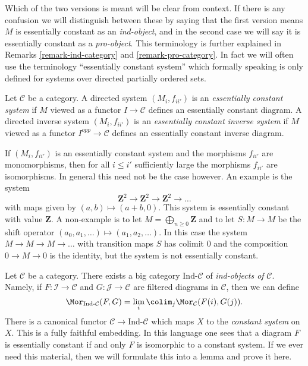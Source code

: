 \noindent
Which of the two versions is meant will be clear from context. If there is
any confusion we will distinguish between these by saying that the first
version means $M$ is essentially constant as an {\it ind-object}, and in
the second case we will say it is essentially constant as a {\it pro-object}.
This terminology is further explained in
Remarks \ref{remark-ind-category} and \ref{remark-pro-category}.
In fact we will often use the terminology ``essentially constant system''
which formally speaking is only defined for systems over directed partially
ordered sets.

\begin{definition}
\label{definition-essentially-constant-system}
Let $\mathcal{C}$ be a category. A directed system
$(M_i, f_{ii'})$ is an {\it essentially constant system}
if $M$ viewed as a functor $I \to \mathcal{C}$
defines an essentially constant diagram. A directed inverse system
$(M_i, f_{ii'})$ is an {\it essentially constant inverse system} if
$M$ viewed as a functor $I^{opp} \to \mathcal{C}$ defines an
essentially constant inverse diagram.
\end{definition}

\noindent
If $(M_i, f_{ii'})$ is an essentially constant system and the morphisms
$f_{ii'}$ are monomorphisms, then for all $i \leq i'$ sufficiently large the
morphisms $f_{ii'}$ are isomorphisms. In general this need not be the
case however. An example is the system
$$
\mathbf{Z}^2 \to \mathbf{Z}^2 \to \mathbf{Z}^2 \to \ldots
$$
with maps given by $(a, b) \mapsto (a + b, 0)$. This system is essentially
constant with value $\mathbf{Z}$. A non-example is to let
$M = \bigoplus_{n \geq 0} \mathbf{Z}$ and to let $S : M \to M$ be the
shift operator $(a_0, a_1, \ldots) \mapsto (a_1, a_2, \ldots)$. In this
case the system $M \to M \to M \to \ldots$ with transition maps $S$
has colimit $0$ and the composition $0 \to M \to 0$ is the identity,
but the system is not essentially constant.

\begin{remark}
\label{remark-ind-category}
Let $\mathcal{C}$ be a category. There exists a big category
$\text{Ind-}\mathcal{C}$ of {\it ind-objects of} $\mathcal{C}$.
Namely, if $F : \mathcal{I} \to \mathcal{C}$ and
$G : \mathcal{J} \to \mathcal{C}$ are filtered diagrams in $\mathcal{C}$,
then we can define
$$
\Mor_{\text{Ind-}\mathcal{C}}(F, G) =
\lim_i \colim_j \Mor_\mathcal{C}(F(i), G(j)).
$$
There is a canonical functor $\mathcal{C} \to \text{Ind-}\mathcal{C}$
which maps $X$ to the {\it constant system} on $X$. This is a fully
faithful embedding. In this language one sees that a diagram $F$ is
essentially constant if and only $F$ is isomorphic to a constant system.
If we ever need this material, then we will formulate this into a lemma
and prove it here.
\end{remark}

